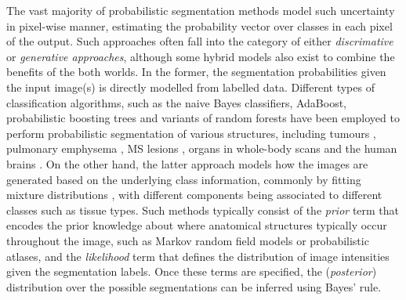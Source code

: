 The vast majority of probabilistic segmentation methods model such uncertainty in pixel-wise manner, estimating the probability vector over classes in each pixel of the output. Such approaches often fall into the category of either \textit{discrimative} or \textit{generative approaches}, although some hybrid models also exist \cite{heckemann2006automatic,tu2008brain,iglesias2011combining,criminisi2011discriminative,menze2015generative} to combine the benefits of the both worlds. In the former,  the segmentation probabilities given the input image(s) is directly modelled from labelled data. Different types of classification algorithms, such as the naive Bayes classifiers, AdaBoost, probabilistic boosting trees and variants of random forests have been employed to perform probabilistic segmentation of various structures, including tumours \cite{wels2008discriminative,le2016lifted}, pulmonary emphysema  \cite{prasad2008multi}, MS lesions \cite{geremia2011spatial}, organs in whole-body scans \cite{criminisi2009decision,montillo2011entangled} and the human brains \cite{morra2008automatic,wang2015links}. On the other hand, the latter approach models how the images are generated based on the underlying class information, commonly by fitting mixture distributions \cite{lei1992statistical,liang1994parameter,wells1996adaptive,van1999automated,zhang2001segmentation,wyatt2003map,ashburner2005unified}, with different components being associated to different classes such as tissue types. Such methods typically consist of the \textit{prior} term that encodes the prior knowledge about where anatomical structures typically occur throughout the image, such as Markov random field models or probabilistic atlases, and the \textit{likelihood} term that defines the distribution of image intensities given the segmentation labels. Once these terms are specified, the (\textit{posterior}) distribution over the possible segmentations can be inferred using Bayes’ rule. 

